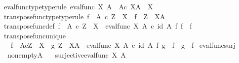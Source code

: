 \begin{isabellebody}
\ \ eval{\isacharunderscore}{\kern0pt}func{\isacharunderscore}{\kern0pt}type{\isacharbrackleft}{\kern0pt}type{\isacharunderscore}{\kern0pt}rule{\isacharbrackright}{\kern0pt}{\isacharcolon}{\kern0pt}\ {\isachardoublequoteopen}eval{\isacharunderscore}{\kern0pt}func\ X\ A\ {\isacharcolon}{\kern0pt}\ A{\isasymtimes}\isactrlsub c\ X\isactrlbsup A\isactrlesup \ {\isasymrightarrow}\ X{\isachardoublequoteclose}\ \isanewline
\ \ transpose{\isacharunderscore}{\kern0pt}func{\isacharunderscore}{\kern0pt}type{\isacharbrackleft}{\kern0pt}type{\isacharunderscore}{\kern0pt}rule{\isacharbrackright}{\kern0pt}{\isacharcolon}{\kern0pt}\ {\isachardoublequoteopen}f\ {\isacharcolon}{\kern0pt}\ A\ {\isasymtimes}\isactrlsub c\ Z\ {\isasymrightarrow}\ X\ {\isasymLongrightarrow}\ f\isactrlsup {\isasymsharp}\ {\isacharcolon}{\kern0pt}\ Z\ {\isasymrightarrow}\ X\isactrlbsup A\isactrlesup {\isachardoublequoteclose}\ \isanewline
\ \ transpose{\isacharunderscore}{\kern0pt}func{\isacharunderscore}{\kern0pt}def{\isacharcolon}{\kern0pt}\ {\isachardoublequoteopen}f\ {\isacharcolon}{\kern0pt}\ A\ {\isasymtimes}\isactrlsub c\ Z\ {\isasymrightarrow}\ X\ {\isasymLongrightarrow}\ {\isacharparenleft}{\kern0pt}eval{\isacharunderscore}{\kern0pt}func\ X\ A{\isacharparenright}{\kern0pt}\ {\isasymcirc}\isactrlsub c\ {\isacharparenleft}{\kern0pt}id\ A\ {\isasymtimes}\isactrlsub f\ f\isactrlsup {\isasymsharp}{\isacharparenright}{\kern0pt}\ {\isacharequal}{\kern0pt}\ f{\isachardoublequoteclose}\ \isanewline
\ \ transpose{\isacharunderscore}{\kern0pt}func{\isacharunderscore}{\kern0pt}unique{\isacharcolon}{\kern0pt}\ \isanewline
\ \ \ \ {\isachardoublequoteopen}f\ {\isacharcolon}{\kern0pt}\ A{\isasymtimes}\isactrlsub cZ\ {\isasymrightarrow}\ X\ {\isasymLongrightarrow}\ g{\isacharcolon}{\kern0pt}\ Z\ {\isasymrightarrow}\ X\isactrlbsup A\isactrlesup \ {\isasymLongrightarrow}\ {\isacharparenleft}{\kern0pt}eval{\isacharunderscore}{\kern0pt}func\ X\ A{\isacharparenright}{\kern0pt}\ {\isasymcirc}\isactrlsub c\ {\isacharparenleft}{\kern0pt}id\ A\ {\isasymtimes}\isactrlsub f\ g{\isacharparenright}{\kern0pt}\ {\isacharequal}{\kern0pt}\ f\ {\isasymLongrightarrow}\ g\ {\isacharequal}{\kern0pt}\ f\isactrlsup {\isasymsharp}{\isachardoublequoteclose}\isanewline
\isanewline
{}\isamarkupfalse%
\ eval{\isacharunderscore}{\kern0pt}func{\isacharunderscore}{\kern0pt}surj{\isacharcolon}{\kern0pt}\isanewline
\ \ \ {\isachardoublequoteopen}nonempty{\isacharparenleft}{\kern0pt}A{\isacharparenright}{\kern0pt}{\isachardoublequoteclose}\isanewline
\ \ \ {\isachardoublequoteopen}surjective{\isacharparenleft}{\kern0pt}{\isacharparenleft}{\kern0pt}eval{\isacharunderscore}{\kern0pt}func\ X\ A{\isacharparenright}{\kern0pt}{\isacharparenright}{\kern0pt}{\isachardoublequoteclose}\isanewline

\end{isabellebody}
